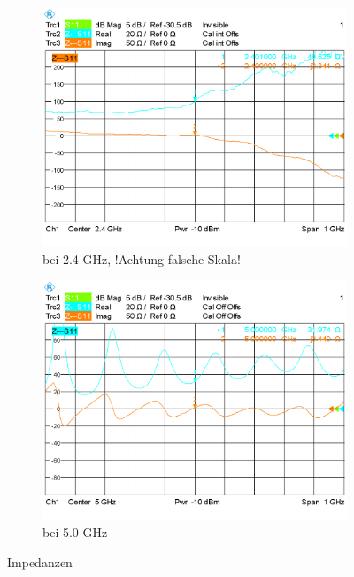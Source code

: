 \begin{figure}[htbp]
	\begin{center}
		\begin{subfigure}[t]{0.49\textwidth}
			\begin{center}
				\includegraphics[width=1\textwidth]{../fig/plt/IMP_WITH_2_4.PNG}
				\caption{bei 2.4 GHz, !Achtung falsche Skala!}
				\label{fig:Imp_with_full_2.4}
			\end{center}
		\end{subfigure}
		\begin{subfigure}[t]{0.49\textwidth}
			\begin{center}
				\includegraphics[width=1\textwidth]{../fig/plt/IMP_WITH_5_0.PNG}
				\caption{bei 5.0 GHz}
				\label{fig:Imp_with_full_5.0}
			\end{center}
		\end{subfigure}
		\caption{Impedanzen}
		\label{fig:Imp_each}
	\end{center}
\end{figure}


